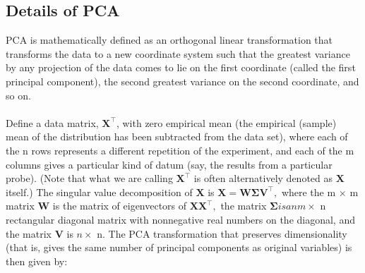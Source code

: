 \documentclass[10pt,a4paper]{article}
\begin{document}
\subsection{Details of PCA}

PCA is mathematically defined  as an orthogonal linear transformation that transforms the data to a new coordinate system such that the greatest variance by any projection of the data comes to lie on the first coordinate (called the first principal component), the second greatest variance on the second coordinate, and so on.\\ \\

Define a data matrix,  \begin{math} \mathbf X^\top  \end{math}, with zero empirical mean (the empirical (sample) mean of the distribution has been subtracted from the data set), where each of the n rows represents a different repetition of the experiment, and each of the m columns gives a particular kind of datum (say, the results from a particular probe). (Note that what we are calling \begin{math} \mathbf X^\top \end{math} is often alternatively denoted as \begin{math} \mathbf X \end{math} itself.) The singular value decomposition of \begin{math} \mathbf X \end{math} is \begin{math} \mathbf X = \mathbf{W\Sigma V}^\top, \end{math}  where the m \begin{math} \times \end{math} m matrix \begin{math} \mathbf W \end{math}  is the matrix of eigenvectors of \begin{math} \mathbf{XX}^\top, \end{math} the matrix \begin{math} \mathbf\Sigma is an m\times \end{math} n rectangular diagonal matrix with nonnegative real numbers on the diagonal, and the matrix \begin{math} \mathbf V \end{math} is  \begin{math} n\times \end{math} n. The PCA transformation that preserves dimensionality (that is, gives the same number of principal components as original variables) is then given by: \\ \\
\end{document}
